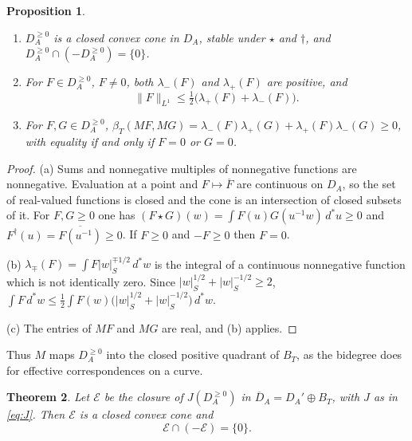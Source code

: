 \documentclass[11pt]{amsart}
\newtheorem{theorem}{Theorem}[section]
\newtheorem{proposition}[theorem]{Proposition}
\theoremstyle{definition}
\theoremstyle{remark}
\newcommand{\dstar}{\,d^{*}}
\newcommand{\DA}{D_A}
\newcommand{\BT}{B_T}
\newcommand{\NAd}{\overline{D}_A}
\begin{document}
\begin{proposition}\label{prop:effsmear}
\begin{enumerate}
\item[(a)] $\DA^{\ge0}$ is a closed convex cone in $\DA$, stable
under $\star$ and $\dagger$, and
$\DA^{\ge0}\cap(-\DA^{\ge0})=\{0\}$.
\item[(b)] For $F\in\DA^{\ge0}$, $F\ne0$, both $\lambda_-(F)$ and
$\lambda_+(F)$ are positive, and
\begin{equation}\label{eq:amgm}
\lVert F\rVert_{L^{1}}\le\tfrac12\bigl(\lambda_+(F)+\lambda_-(F)\bigr).
\end{equation}
\item[(c)] For $F,G\in\DA^{\ge0}$,
$\beta_T(MF,MG)=\lambda_-(F)\lambda_+(G)+\lambda_+(F)\lambda_-(G)\ge0$, with
equality if and only if $F=0$ or $G=0$.
\end{enumerate}
\end{proposition}

\begin{proof}
(a)  Sums and nonnegative multiples of nonnegative functions are nonnegative.
Evaluation at a point and $F\mapsto\overline F$ are continuous on $\DA$, so
the set of real-valued functions is closed and the cone is an intersection of
closed subsets of it.  For $F,G\ge0$ one has
$(F\star G)(w)=\int F(u)G(u^{-1}w)\dstar u\ge0$ and
$F^{\dagger}(u)=\overline{F(u^{-1})}\ge0$.  If $F\ge0$ and $-F\ge0$ then
$F=0$.

(b)  $\lambda_{\mp}(F)=\int F|w|_S^{\mp1/2}\dstar w$ is the integral of a
continuous nonnegative function which is not identically zero.  Since
$|w|_S^{1/2}+|w|_S^{-1/2}\ge2$,
$\int F\dstar w\le\tfrac12\int F(w)\bigl(|w|_S^{1/2}+|w|_S^{-1/2}\bigr)\dstar w$.

(c)  The entries of $MF$ and $MG$ are real, and (b) applies.
\end{proof}

Thus $M$ maps $\DA^{\ge0}$ into the closed positive quadrant of $\BT$, as the
bidegree does for effective correspondences on a curve.

\begin{theorem}\label{thm:coneproper}
Let $\mathcal E$ be the closure of $J(\DA^{\ge0})$ in
$\NAd=\DA'\oplus\BT$, with $J$ as in \eqref{eq:J}.  Then $\mathcal E$ is a
closed convex cone and
\begin{equation}\label{eq:properdist}
\mathcal E\cap(-\mathcal E)=\{0\}.
\end{equation}
\end{theorem}
\end{document}
